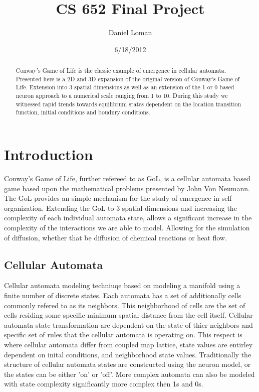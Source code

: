 \documentclass[11pt,twocolumn]{article}
\title{\textbf{CS 652 Final Project }}
\author{Daniel Loman}
\date{6/18/2012}
\begin{document}
\maketitle
\begin{abstract}
Conway's Game of Life is the classic example of emergence in cellular automata. Presented here is a 2D and 3D expansion of the original version of Conway's Game of Life. Extension into 3 spatial dimensions as well as an extension of the 1 or 0 based neuron approach to a numerical scale ranging from 1 to 10. During this study we witnessed rapid trends towards equilibrum states dependent on the location transition function, initial conditions and boudnry conditions.
\end{abstract}
\section{Introduction}
Conway's Game of Life, further refereed to as GoL, is a cellular automata based game based upon the mathematical problems presented by John Von Neumann. The GoL provides an simple mechanism for the study of emergence in self-organization.\cite{arc02}
Extending the GoL to 3 spatial dimensions and increasing the complexity of each individual automata state, allows a significant increase in the complexity of the interactions we are able to model. 
Allowing for the simulation of diffusion, whether that be diffusion of chemical reactions or heat flow.  
\subsection{Cellular Automata}
 Cellular automata modeling techniuqe based on modeling a manifold 
 using a finite number of discrete states. 
 Each automata has a set of additionally cells commonly refered to as its neighbors.\cite{boc} 
 This neighborhood of cells are the set of cells residing some specific minimum spatial distance from the cell itself. 
 Cellular automata state transformation are dependent on the state of thier neighbors and specific set of rules that the cellular automata is operating on.\cite{guinot}
 This respect is where cellular automata differ from coupled map lattice, state values are entirley dependent on inital conditions, and neighborhood state values.
 Traditionally the structure of cellular automata states are constructed using the neuron model, or the states can be either 'on' or 'off'. 
 More complex automata can also be modeled with state complexity significantly more complex then 1s and 0s.\cite{wolfram}
\end{document}

